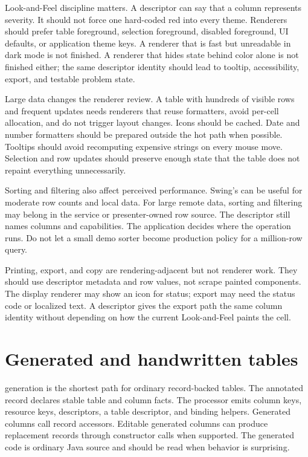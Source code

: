 Look-and-Feel discipline matters. A descriptor can say that a column
represents severity. It should not force one hard-coded red into every theme.
Renderers should prefer table foreground, selection foreground, disabled
foreground, UI defaults, or application theme keys. A renderer that is fast
but unreadable in dark mode is not finished. A renderer that hides state
behind color alone is not finished either; the same descriptor identity should
lead to tooltip, accessibility, export, and testable problem state.

Large data changes the renderer review. A table with hundreds of visible rows
and frequent updates needs renderers that reuse formatters, avoid per-cell
allocation, and do not trigger layout changes. Icons should be cached. Date
and number formatters should be prepared outside the hot path when possible.
Tooltips should avoid recomputing expensive strings on every mouse move.
Selection and row updates should preserve enough state that the table does
not repaint everything unnecessarily.

Sorting and filtering also affect perceived performance. Swing's
 can be useful for moderate row counts and local data. For
large remote data, sorting and filtering may belong in the service or
presenter-owned row source. The descriptor still names columns and
capabilities. The application decides where the operation runs. Do not let a
small demo sorter become production policy for a million-row query.

Printing, export, and copy are rendering-adjacent but not renderer work. They
should use descriptor metadata and row values, not scrape painted components.
The display renderer may show an icon for status; export may need the status
code or localized text. A descriptor gives the export path the same column
identity without depending on how the current Look-and-Feel paints the cell.

\section{Generated and handwritten tables}

 generation is the shortest path for ordinary record-backed
tables. The annotated record declares stable table and column facts. The
processor emits column keys, resource keys, descriptors, a table descriptor,
and binding helpers. Generated columns call record accessors. Editable
generated columns can produce replacement records through constructor calls
when supported. The generated code is ordinary Java source and should be read
when behavior is surprising.

